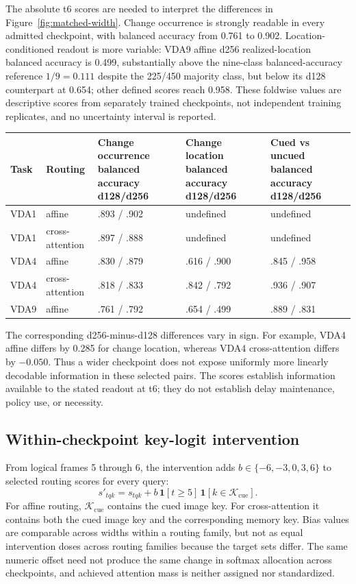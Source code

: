 \documentclass[11pt,a4paper]{article}
\begin{document}
The absolute t6 scores are needed to interpret the differences in Figure~\ref{fig:matched-width}. Change occurrence is strongly readable in every admitted checkpoint, with balanced accuracy from 0.761 to 0.902. Location-conditioned readout is more variable: VDA9 affine d256 realized-location balanced accuracy is 0.499, substantially above the nine-class balanced-accuracy reference $1/9=0.111$ despite the 225/450 majority class, but below its d128 counterpart at 0.654; other defined scores reach 0.958. These foldwise values are descriptive scores from separately trained checkpoints, not independent training replicates, and no uncertainty interval is reported.

\begingroup\small
{}\label{tab:decoder-scores}
\begin{tabularx}{\textwidth}{@{}p{3.0cm}p{2.2cm}Y Y Y@{}}
\toprule
Task & Routing & Change occurrence balanced accuracy d128/d256 & Change location balanced accuracy d128/d256 & Cued vs uncued balanced accuracy d128/d256\\
\midrule
VDA1 & affine & .893 / .902 & undefined & undefined\\
VDA1 & cross-attention & .897 / .888 & undefined & undefined\\
VDA4 & affine & .830 / .879 & .616 / .900 & .845 / .958\\
VDA4 & cross-attention & .818 / .833 & .842 / .792 & .936 / .907\\
VDA9 & affine & .761 / .792 & .654 / .499 & .889 / .831\\
\bottomrule
\end{tabularx}
\endgroup

The corresponding d256-minus-d128 differences vary in sign. For example, VDA4 affine differs by 0.285 for change location, whereas VDA4 cross-attention differs by $-0.050$. Thus a wider checkpoint does not expose uniformly more linearly decodable information in these selected pairs. The scores establish information available to the stated readout at t6; they do not establish delay maintenance, policy use, or necessity.

\subsection{Within-checkpoint key-logit intervention}
From logical frames 5 through 6, the intervention adds $b\in\{-6,-3,0,3,6\}$ to selected routing scores for every query:
\begin{equation}
s'_{tqk}=s_{tqk}+b\,\mathbf{1}[t\geq5]\,\mathbf{1}[k\in\mathcal{K}_{\mathrm{cue}}].
\end{equation}
For affine routing, $\mathcal{K}_{\mathrm{cue}}$ contains the cued image key. For cross-attention it contains both the cued image key and the corresponding memory key. Bias values are comparable across widths within a routing family, but not as equal intervention doses across routing families because the target sets differ. The same numeric offset need not produce the same change in softmax allocation across checkpoints, and achieved attention mass is neither assigned nor standardized.
\end{document}
